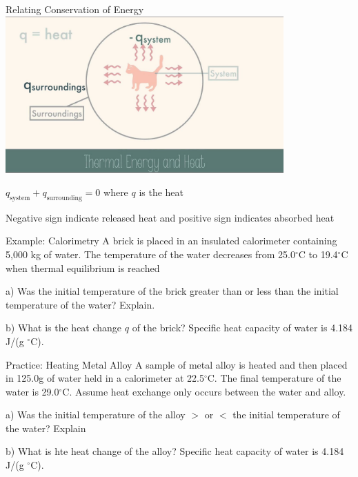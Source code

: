 \documentclass[11pt]{beamer}
\begin{document}
\begin{frame}{Relating Conservation of Energy}
  \centering
  \includegraphics[width=0.8\textwidth]{heat_sys}

  $q_\text{system} + q_\text{surrounding} = 0$
  where $q$ is the heat

  Negative sign indicate released heat and positive sign indicates
  absorbed heat
\end{frame}

\begin{frame}{Example: Calorimetry}
  A brick is placed in an insulated calorimeter containing 5,000 kg of
  water. The temperature of the water decreases from 25.0$^\circ$C to
  19.4$^\circ$C when thermal equilibrium is reached

  a) Was the initial temperature of the brick greater than or less than
  the initial temperature of the water? Explain.

  b) What is the heat change $q$ of the brick? Specific heat capacity
  of water is 4.184 J/(g $^\circ$C).

  \vfill
\end{frame}

\begin{frame}{Practice: Heating Metal Alloy}
  A sample of metal alloy is heated and then placed in 125.0g of water
  held in a calorimeter at 22.5$^\circ$C. The final temperature of the water
  is 29.0$^\circ$C. Assume heat exchange only occurs between the water and alloy.

  a) Was the initial temperature of the alloy $>$ or $<$ the initial
  temperature of the water? Explain

  b) What is hte heat change of the alloy? Specific heat capacity
  of water is 4.184 J/(g $^\circ$C).

  \vfill
\end{frame}
\end{document}
